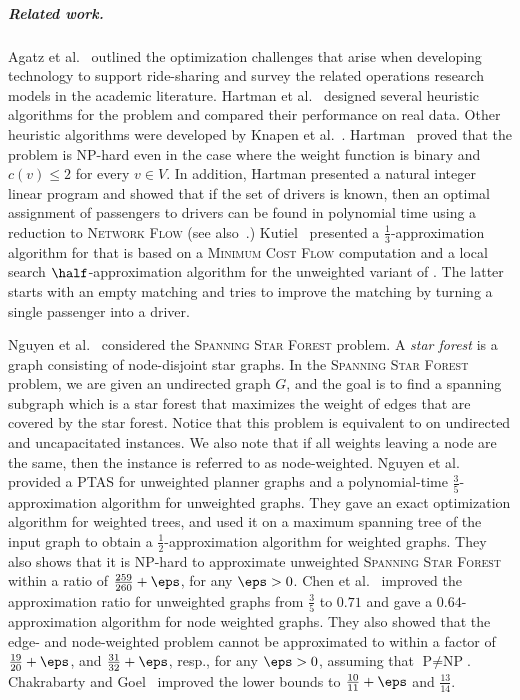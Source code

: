 
\subparagraph{Related work.}
%
Agatz et al.~\cite{agatz2012optimization} outlined the optimization
challenges that arise when developing technology to support
ride-sharing and survey the related operations research models in the
academic literature.
%
Hartman et al.~\cite{hartman2014theory} designed several heuristic
algorithms for the \carpool problem and compared their performance on
real data.  Other heuristic algorithms were developed by Knapen et
al.~\cite{knapen2014exploiting}.
%
Hartman~\cite{hartman2013optimal} proved that the \carpool problem is
NP-hard even in the case where the weight function is binary and
$c(v) \leq 2$ for every $v \in V$.  In addition, Hartman presented a
natural integer linear program and showed that if the set of drivers
is known, then an optimal assignment of passengers to drivers can be
found in polynomial time using a reduction to \textsc{Network Flow}
(see also~\cite{kutiel2017}.)
%
Kutiel~\cite{kutiel2017} presented a $\frac{1}{3}$-approximation
algorithm for \carpool that is based on a \textsc{Minimum Cost Flow}
computation and a local search $\half$-approximation algorithm for the
unweighted variant of \carpool.  The latter starts with an empty
matching and tries to improve the matching by turning a single
passenger into a driver.

Nguyen et al.~\cite{nguyen2008approximating} considered
the \textsc{Spanning Star Forest} problem.  A \emph{star forest} is a
graph consisting of node-disjoint star graphs.  In
the \textsc{Spanning Star Forest} problem, we are given an undirected
graph $G$, and the goal is to find a spanning subgraph which is a star
forest that maximizes the weight of edges that are covered by the star
forest.  Notice that this problem is equivalent to \carpool on
undirected and uncapacitated instances.  We also note that if all
weights leaving a node are the same, then the instance is referred to
as node-weighted.
%
Nguyen et al.~\cite{nguyen2008approximating} provided a PTAS for
unweighted planner graphs and a polynomial-time
$\frac{3}{5}$-approximation algorithm for unweighted graphs.  They
gave an exact optimization algorithm for weighted trees, and used it
on a maximum spanning tree of the input graph to obtain a
$\frac{1}{2}$-approximation algorithm for weighted graphs.  They also
shows that it is NP-hard to approximate unweighted \textsc{Spanning
Star Forest} within a ratio of $\frac{259}{260}+\eps$, for any
$\eps>0$.
%
%
Chen et al.~\cite{CENRRS13} improved the approximation ratio for
unweighted graphs from $\frac{3}{5}$ to $0.71$ and gave a
$0.64$-approximation algorithm for node weighted graphs.  They also
showed that the edge- and node-weighted problem cannot be approximated
to within a factor of $\frac{19}{20} + \eps$, and $\frac{31}{32}
+ \eps$, resp., for any $\eps > 0$, assuming that
$\text{P} \neq \text{NP}$.
%
Chakrabarty and Goel~\cite{ChakrabartyGoel10} improved the lower bounds
to $\frac{10}{11} + \eps$ and $\frac{13}{14}$.

